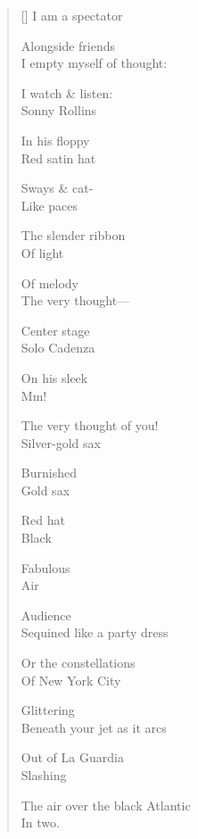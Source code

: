 \label{ch:as_you_leave}
\settowidth{\versewidth}{The air over the black Atlantic}
\begin{verse}[\versewidth]
I am a spectator

Alongside friends\\
I empty myself of thought:

I watch \& listen:\\
Sonny Rollins

In his floppy\\
Red satin hat

Sways \& cat-\\
Like paces

The slender ribbon\\
Of light

Of melody\\
The very thought---

Center stage\\
Solo Cadenza

On his sleek\\
Mm!

The very thought of you!\\
Silver-gold sax

Burnished\\
Gold sax

Red hat\\
Black

Fabulous\\
Air

Audience\\
Sequined like a party dress

Or the constellations\\
Of New York City

Glittering\\
Beneath your jet as it arcs

Out of La Guardia\\
Slashing

The air over the black Atlantic\\
In two.
\end{verse}
